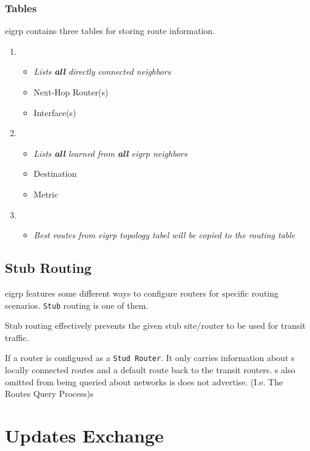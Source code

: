 \subsubsection{Tables}

\gls{eigrp} contains three tables for storing route information.

\begin{enumerate}
    \item {}
    \begin{itemize}
        \item \textit{Lists \textbf{all} directly connected neighbors}
        \item Next-Hop Router(s)
        \item Interface(s)
    \end{itemize}
    \item {}
    \begin{itemize}
        \item \textit{Lists \textbf{all} learned from \textbf{all} \gls{eigrp} neighbors}
        \item Destination
        \item Metric
    \end{itemize}
    \item {}
    \begin{itemize}
        \item \textit{Best routes from \gls{eigrp} topology tabel will be copied to the routing table}
    \end{itemize}
\end{enumerate}

\subsection{Stub Routing}

\gls{eigrp} features some different ways to configure routers for specific routing scenarios. \texttt{Stub} routing is one of them.

Stub routing effectively prevents the given stub site/router to be used for transit traffic.

If a router is configured as a \texttt{Stud Router}. It only carries information about s locally connected routes and a default route back to the transit routers. s also omitted from being queried about networks is does not advertise. {\small (I.e. The Routes Query Process)}s

\section{Updates Exchange}

